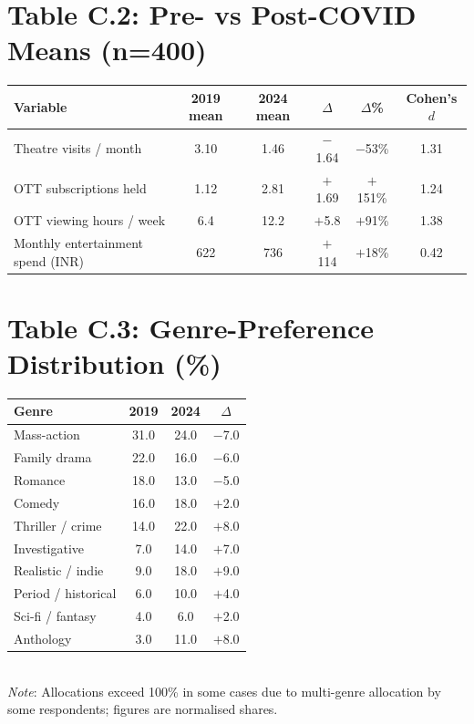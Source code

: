 \section{Table C.2: Pre- vs Post-COVID Means (n=400)}
\begin{tabularx}{\textwidth}{X c c c c c}
\toprule
\textbf{Variable} & \textbf{2019 mean} & \textbf{2024 mean} &
\textbf{$\Delta$} & \textbf{$\Delta$\%} & \textbf{Cohen's $d$}\\
\midrule
Theatre visits / month     & 3.10 & 1.46 & $-$1.64 & $-$53\% & 1.31 \\
OTT subscriptions held     & 1.12 & 2.81 & $+$1.69 & $+$151\% & 1.24 \\
OTT viewing hours / week   & 6.4  & 12.2 & $+$5.8 & $+$91\% & 1.38 \\
Monthly entertainment spend (INR) & 622 & 736 & $+$114 & $+$18\% & 0.42 \\
\bottomrule
\end{tabularx}

\section{Table C.3: Genre-Preference Distribution (\%)}
\begin{tabularx}{\textwidth}{l c c c}
\toprule
\textbf{Genre} & \textbf{2019} & \textbf{2024} & \textbf{$\Delta$}\\
\midrule
Mass-action              & 31.0 & 24.0 & $-$7.0 \\
Family drama             & 22.0 & 16.0 & $-$6.0 \\
Romance                  & 18.0 & 13.0 & $-$5.0 \\
Comedy                   & 16.0 & 18.0 & $+$2.0 \\
Thriller / crime         & 14.0 & 22.0 & $+$8.0 \\
Investigative            &  7.0 & 14.0 & $+$7.0 \\
Realistic / indie        &  9.0 & 18.0 & $+$9.0 \\
Period / historical      &  6.0 & 10.0 & $+$4.0 \\
Sci-fi / fantasy         &  4.0 &  6.0 & $+$2.0 \\
Anthology                &  3.0 & 11.0 & $+$8.0 \\
\bottomrule
\end{tabularx}
\\\smallskip
\textit{Note}: Allocations exceed 100\% in some cases due to
multi-genre allocation by some respondents; figures are normalised
shares.

